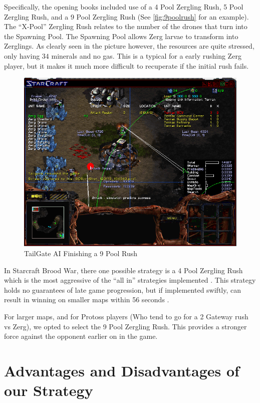 \documentclass{article}
\begin{document}
Specifically, the opening books included use of a 4 Pool Zergling Rush, 5 Pool Zergling Rush, and a 9 Pool Zergling Rush (See \autoref{fig:9poolrush} for an example). The ``X-Pool'' Zergling Rush relates to the number of the drones that turn into the Spawning Pool. The Spawning Pool allows Zerg larvae to transform into Zerglings. As clearly seen in the picture however, the resources are quite stressed, only having $34$ minerals and no gas. This is a typical for a early rushing Zerg player, but it makes it much more difficult to recuperate if the initial rush fails.

\begin{figure}[!ht]
    \centering
	\includegraphics[width=\textwidth]{images/tailgate_ai.png}
	\caption{TailGate AI Finishing a 9 Pool Rush \cite{9poolvprotoss}}
	\label{fig:9poolrush}
\end{figure}

In Starcraft Brood War, there one possible strategy is a 4 Pool Zergling Rush which is the most aggressive of the ``all in'' strategies implemented \cite{4poolrush}. This strategy holds no guarantees of late game progression, but if implemented swiftly, can result in winning on smaller maps within 56 seconds \cite{9poolvprotoss}.

For larger maps, and for Protoss players (Who tend to go for a 2 Gateway rush vs Zerg), we opted to select the 9 Pool Zergling Rush. This provides a stronger force against the opponent earlier on in the game.

\section{Advantages and Disadvantages of our Strategy}
\end{document}
